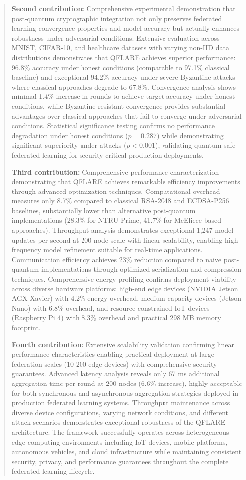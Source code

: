 \documentclass{svproc}
\begin{document}
\begin{abstract}
\textbf{Second contribution:} Comprehensive experimental demonstration that post-quantum cryptographic integration not only preserves federated learning convergence properties and model accuracy but actually enhances robustness under adversarial conditions. Extensive evaluation across MNIST, CIFAR-10, and healthcare datasets with varying non-IID data distributions demonstrates that QFLARE achieves superior performance: 96.8\% accuracy under honest conditions (comparable to 97.1\% classical baseline) and exceptional 94.2\% accuracy under severe Byzantine attacks where classical approaches degrade to 67.8\%. Convergence analysis shows minimal 1.4\% increase in rounds to achieve target accuracy under honest conditions, while Byzantine-resistant convergence provides substantial advantages over classical approaches that fail to converge under adversarial conditions. Statistical significance testing confirms no performance degradation under honest conditions ($p = 0.287$) while demonstrating significant superiority under attacks ($p < 0.001$), validating quantum-safe federated learning for security-critical production deployments.

\textbf{Third contribution:} Comprehensive performance characterization demonstrating that QFLARE achieves remarkable efficiency improvements through advanced optimization techniques. Computational overhead measures only 8.7\% compared to classical RSA-2048 and ECDSA-P256 baselines, substantially lower than alternative post-quantum implementations (28.3\% for NTRU Prime, 41.7\% for McEliece-based approaches). Throughput analysis demonstrates exceptional 1,247 model updates per second at 200-node scale with linear scalability, enabling high-frequency model refinement suitable for real-time applications. Communication efficiency achieves 23\% reduction compared to naive post-quantum implementations through optimized serialization and compression techniques. Comprehensive energy profiling confirms deployment viability across diverse hardware platforms: high-end edge devices (NVIDIA Jetson AGX Xavier) with 4.2\% energy overhead, medium-capacity devices (Jetson Nano) with 6.8\% overhead, and resource-constrained IoT devices (Raspberry Pi 4) with 8.3\% overhead and practical 298 MB memory footprint.

\textbf{Fourth contribution:} Extensive scalability validation confirming linear performance characteristics enabling practical deployment at large federation scales (10-200 edge devices) with comprehensive security guarantees. Advanced latency analysis reveals only 67 ms additional aggregation time per round at 200 nodes (6.6\% increase), highly acceptable for both synchronous and asynchronous aggregation strategies deployed in production federated learning systems. Throughput maintenance across diverse device configurations, varying network conditions, and different attack scenarios demonstrates exceptional robustness of the QFLARE architecture. The framework successfully operates across heterogeneous edge computing environments including IoT devices, mobile platforms, autonomous vehicles, and cloud infrastructure while maintaining consistent security, privacy, and performance guarantees throughout the complete federated learning lifecycle.


\end{abstract}
\end{document}
